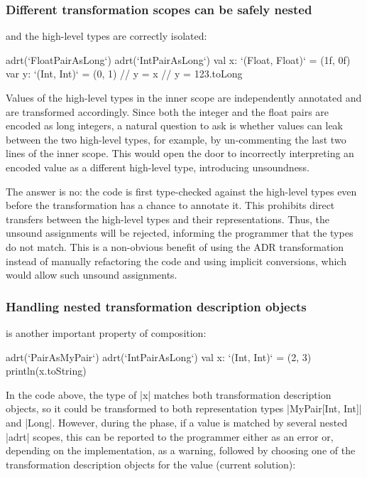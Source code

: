 \subsubsection{Different transformation scopes can be safely nested} and the high-level types are correctly isolated:

\begin{lstlisting-nobreak}
adrt(`FloatPairAsLong`) {
  adrt(`IntPairAsLong`) {
    val x: `(Float, Float)` = (1f, 0f)
    var y: `(Int, Int)` = (0, 1)
    // y = x
    // y = 123.toLong
  }
}
\end{lstlisting-nobreak}

Values of the high-level types in the inner scope are independently annotated and are transformed accordingly. Since both the integer and the float pairs are encoded as long integers, a natural question to ask is whether values can leak between the two high-level types, for example, by un-commenting the last two lines of the inner scope. This would open the door to incorrectly interpreting an encoded value as a different high-level type, introducing unsoundness.

The answer is no: the code is first type-checked against the high-level types even before the \inject{} transformation has a chance to annotate it. This prohibits direct transfers between the high-level types and their representations. Thus, the unsound assignments will be rejected, informing the programmer that the types do not match. This is a non-obvious benefit of using the ADR transformation instead of manually refactoring the code and using implicit conversions, which would allow such unsound assignments.

\subsubsection{Handling nested transformation description objects} is another important property of composition:

\begin{lstlisting-nobreak}
adrt(`PairAsMyPair`) {
  adrt(`IntPairAsLong`) {
    val x: `(Int, Int)` = (2, 3)
  }
  println(x.toString)
}
\end{lstlisting-nobreak}

In the code above, the type of |x| matches both transformation description objects, so it could be transformed to both representation types |MyPair[Int, Int]| and |Long|. However, during the \inject{} phase, if a value is matched by several nested |adrt| scopes, this can be reported to the programmer either as an error or, depending on the implementation, as a warning, followed by choosing one of the transformation description objects for the value (current solution):

